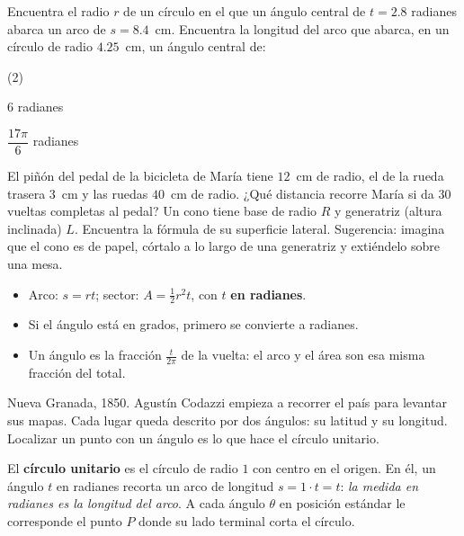 \documentclass[11pt]{article}
\begin{document}
\begin{preguntas}
\pregunta Encuentra el radio $r$ de un círculo en el que un ángulo central de
$t = \num{2,8}$ radianes abarca un arco de $s = \num{8,4}$~cm.
\espacio{2cm}
\pregunta Encuentra la longitud del arco que abarca, en un círculo de radio
$\num{4,25}$~cm, un ángulo central de:
\begin{opciones*}(2)
  \item $6$ radianes
  \item $\dfrac{17\pi}{6}$ radianes
\end{opciones*}
\espacio{2cm}
\pregunta El piñón del pedal de la bicicleta de María tiene $12$~cm de radio, el de
la rueda trasera $3$~cm y las ruedas $40$~cm de radio. ¿Qué distancia recorre María
si da $30$ vueltas completas al pedal?
\espacio{3cm}
\pregunta Un cono tiene base de radio $R$ y generatriz (altura inclinada) $L$.
Encuentra la fórmula de su superficie lateral. Sugerencia: imagina que el cono es
de papel, córtalo a lo largo de una generatriz y extiéndelo sobre una mesa.
\espacio{3.5cm}
\end{preguntas}

\begin{resumen}
\begin{itemize}
  \item Arco: $s = rt$; sector: $A = \frac{1}{2}r^2 t$, con $t$ \textbf{en radianes}.
  \item Si el ángulo está en grados, primero se convierte a radianes.
  \item Un ángulo es la fracción $\frac{t}{2\pi}$ de la vuelta: el arco y el área son esa misma fracción del total.
\end{itemize}
\end{resumen}

\label{tema:circulounitario}

\begin{hilo}
Nueva Granada, 1850. Agustín Codazzi empieza a recorrer el país para levantar
sus mapas. Cada lugar queda descrito por dos ángulos: su latitud y su
longitud. Localizar un punto con un ángulo es lo que hace el círculo unitario.
\end{hilo}

El \textbf{círculo unitario} es el círculo de radio $1$ con centro en el origen.
En él, un ángulo $t$ en radianes recorta un arco de longitud $s = 1\cdot t = t$:
\emph{la medida en radianes es la longitud del arco}. A cada ángulo $\theta$ en
posición estándar le corresponde el punto $P$ donde su lado terminal corta el
círculo.
\end{document}
